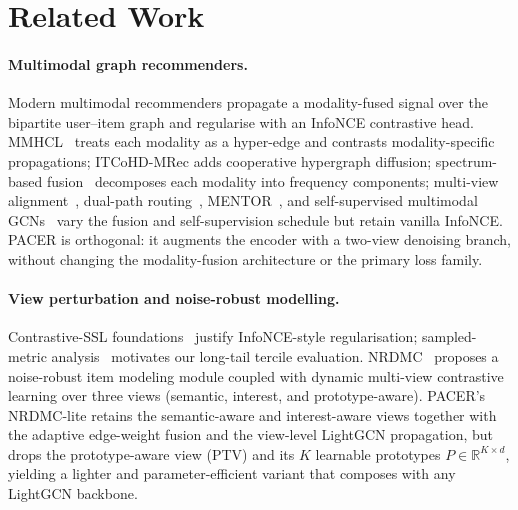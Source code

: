 \documentclass[conference]{IEEEtran}
\begin{document}
\section{Related Work}
\label{sec:related}

\paragraph{Multimodal graph recommenders.} Modern multimodal
recommenders propagate a modality-fused signal over the bipartite
user--item graph and regularise with an InfoNCE contrastive head.
MMHCL~\cite{guo2025mmhcl} treats each modality as a hyper-edge and
contrasts modality-specific propagations; ITCoHD-MRec
\cite{hao2026itcohd} adds cooperative hypergraph diffusion;
spectrum-based fusion~\cite{ong2025spectrum,wang2026damps} decomposes
each modality into frequency components; multi-view
alignment~\cite{li2026multiview}, dual-path
routing~\cite{yan2025compensating}, MENTOR~\cite{xu2025mentor}, and
self-supervised multimodal GCNs~\cite{kim2024self} vary the fusion
and self-supervision schedule but retain vanilla InfoNCE.
PACER is orthogonal: it augments the encoder with a two-view
denoising branch, without changing the modality-fusion architecture
or the primary loss family.

\paragraph{View perturbation and noise-robust modelling.}
Contrastive-SSL foundations~\cite{chen2022intent,liu2021self,liu2023self}
justify InfoNCE-style regularisation; sampled-metric
analysis~\cite{krichene2020sampled} motivates our long-tail tercile
evaluation. NRDMC~\cite{gong2026noise} proposes a noise-robust item
modeling module coupled with dynamic multi-view contrastive learning
over three views (semantic, interest, and prototype-aware). PACER's
NRDMC-lite retains the semantic-aware and interest-aware views
together with the adaptive edge-weight fusion and the view-level
LightGCN propagation, but drops the prototype-aware view (PTV) and
its $K$ learnable prototypes $P\in\mathbb{R}^{K\times d}$, yielding a
lighter and parameter-efficient variant that composes with any
LightGCN backbone.
\end{document}
